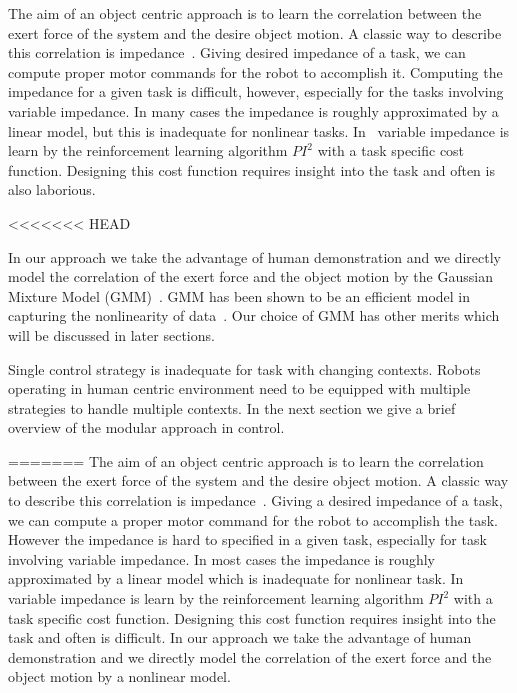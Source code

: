 The aim of an object centric approach is to learn the correlation between the exert force of the system and the desire object motion. A classic way to describe this correlation is impedance~\cite{howard2010transferring,wimbock2012comparison}. Giving  desired impedance of a task, we can compute proper motor commands for the robot to accomplish it. Computing the impedance for a given task is difficult, however, especially for the tasks involving variable impedance.
In many cases the impedance is roughly approximated by a linear model, but this is inadequate for nonlinear tasks. In~\cite{buchli2011learning} variable impedance is learn by the reinforcement learning algorithm $PI^2$ with a task specific cost function. Designing this cost function requires insight into the task and often is also laborious. 


<<<<<<< HEAD

In our approach we take the advantage of human demonstration and we directly model the correlation of the exert force and the object motion by the Gaussian Mixture Model (GMM)~\cite{cohn1996active}. GMM has been shown to be an efficient model in capturing the nonlinearity of data~\cite{huang2013learning,sauser2011iterative,calinon2007incremental}. Our choice of GMM has other merits which will be discussed in later sections.

Single control strategy is inadequate for task with changing contexts.
Robots operating in human centric environment need to be equipped with multiple strategies to handle multiple contexts. In the next section we give a brief overview of the modular approach in control. 

=======
The aim of an object centric approach is to learn the correlation between the exert force of the system and the desire object motion. A classic way to describe this correlation is impedance~\cite{howard2010transferring,wimbock2012comparison}. Giving a desired impedance of a task, we can compute a proper motor command for the robot to accomplish the task. However the impedance is hard to specified in a given task, especially for task involving variable impedance. 
In most cases the impedance is roughly approximated by a linear model which is inadequate for nonlinear task. In~\cite{buchli2011learning} variable impedance is learn by the reinforcement learning algorithm $PI^2$ with a task specific cost function. Designing this cost function requires insight into the task and often is difficult. In our approach we take the advantage of human demonstration and we directly model the correlation of the exert force and the object motion by a nonlinear model.

